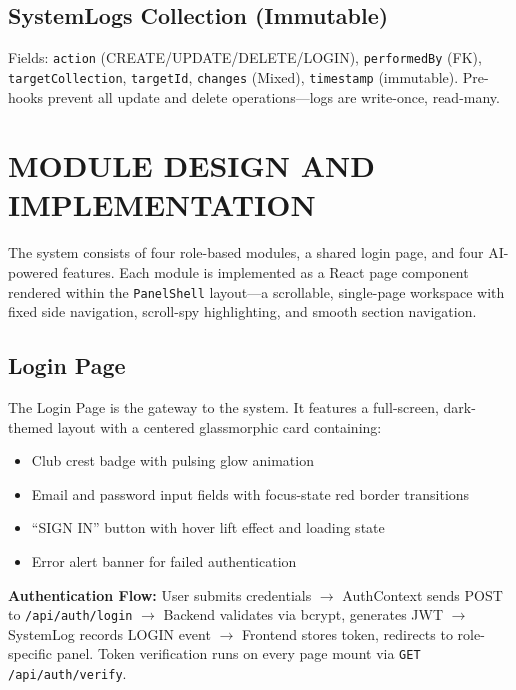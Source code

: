 \documentclass[12pt,a4paper,oneside]{report}
\begin{document}
\section{SystemLogs Collection (Immutable)}

Fields: \texttt{action} (CREATE/UPDATE/DELETE/LOGIN), \texttt{performedBy} (FK), \texttt{targetCollection}, \texttt{targetId}, \texttt{changes} (Mixed), \texttt{timestamp} (immutable). Pre-hooks prevent all update and delete operations---logs are write-once, read-many.


\chapter{MODULE DESIGN AND IMPLEMENTATION}

The system consists of four role-based modules, a shared login page, and four AI-powered features. Each module is implemented as a React page component rendered within the \texttt{PanelShell} layout---a scrollable, single-page workspace with fixed side navigation, scroll-spy highlighting, and smooth section navigation.

\section{Login Page}

The Login Page is the gateway to the system. It features a full-screen, dark-themed layout with a centered glassmorphic card containing:

\begin{itemize}[leftmargin=*]
  \item Club crest badge with pulsing glow animation
  \item Email and password input fields with focus-state red border transitions
  \item ``SIGN IN'' button with hover lift effect and loading state
  \item Error alert banner for failed authentication
\end{itemize}

\noindent\textbf{Authentication Flow:} User submits credentials $\rightarrow$ AuthContext sends POST to \texttt{/api/auth/login} $\rightarrow$ Backend validates via bcrypt, generates JWT $\rightarrow$ SystemLog records LOGIN event $\rightarrow$ Frontend stores token, redirects to role-specific panel. Token verification runs on every page mount via \texttt{GET /api/auth/verify}.
\end{document}
